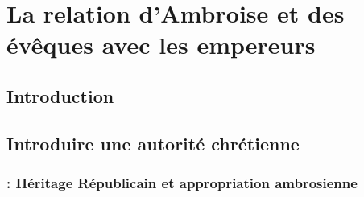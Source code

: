 \section{La relation d’Ambroise et des évêques avec les empereurs}

\subsection*{Introduction}

\subsection{Introduire une autorité chrétienne}

\subsubsection{: Héritage Républicain et appropriation ambrosienne}
